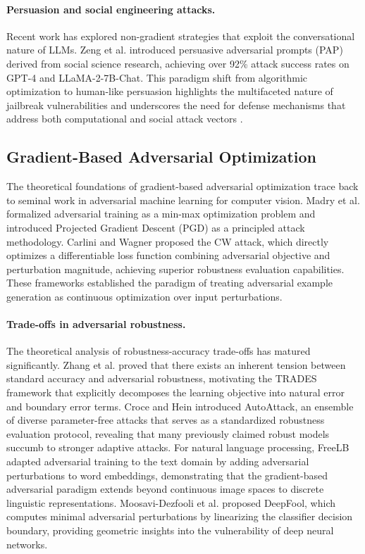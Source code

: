 ﻿\documentclass[lettersize,journal]{IEEEtran}
\begin{document}
\paragraph{Persuasion and social engineering attacks.} Recent work has explored non-gradient strategies that exploit the conversational nature of LLMs. Zeng et al. \cite{zeng2024persuasion} introduced persuasive adversarial prompts (PAP) derived from social science research, achieving over 92\% attack success rates on GPT-4 and LLaMA-2-7B-Chat. This paradigm shift from algorithmic optimization to human-like persuasion highlights the multifaceted nature of jailbreak vulnerabilities and underscores the need for defense mechanisms that address both computational and social attack vectors \cite{yang2023ai_safety_txxb}.

\subsection{Gradient-Based Adversarial Optimization}
\label{sec:rw_gradient}

The theoretical foundations of gradient-based adversarial optimization trace back to seminal work in adversarial machine learning for computer vision. Madry et al. \cite{madry2018towards} formalized adversarial training as a min-max optimization problem and introduced Projected Gradient Descent (PGD) as a principled attack methodology. Carlini and Wagner \cite{carlini2017towards} proposed the CW attack, which directly optimizes a differentiable loss function combining adversarial objective and perturbation magnitude, achieving superior robustness evaluation capabilities. These frameworks established the paradigm of treating adversarial example generation as continuous optimization over input perturbations.

\paragraph{Trade-offs in adversarial robustness.} The theoretical analysis of robustness-accuracy trade-offs has matured significantly. Zhang et al. \cite{zhang2019theoretically} proved that there exists an inherent tension between standard accuracy and adversarial robustness, motivating the TRADES framework that explicitly decomposes the learning objective into natural error and boundary error terms. Croce and Hein \cite{croce2020reliable} introduced AutoAttack, an ensemble of diverse parameter-free attacks that serves as a standardized robustness evaluation protocol, revealing that many previously claimed robust models succumb to stronger adaptive attacks. For natural language processing, FreeLB \cite{zhu2020freelb} adapted adversarial training to the text domain by adding adversarial perturbations to word embeddings, demonstrating that the gradient-based adversarial paradigm extends beyond continuous image spaces to discrete linguistic representations. Moosavi-Dezfooli et al. \cite{moosavi2016deepfool} proposed DeepFool, which computes minimal adversarial perturbations by linearizing the classifier decision boundary, providing geometric insights into the vulnerability of deep neural networks.
\end{document}
